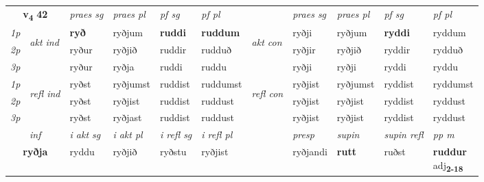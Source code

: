 \noindent
\begin{tabular}{lllllllllll} \toprule
\multicolumn{2}{c}{\textbf{v{\textsubscript{4}}} \Large{\textbf{42}}}  &  \textit{praes sg}  & \textit{praes pl}  &\textit{ pf sg} & \textit{pf pl} &  &  \textit{praes sg}  & \textit{praes pl}  & \textit{pf sg} & \textit{pf pl } \\*
	\cmidrule{3-6} \cmidrule{8-11}
 {\textit{1p}} & \multirow{3}{*}{\begin{turn}{90}\textit{akt ind}\end{turn}} & \textbf{ryð} & ryðjum & \textbf{ruddi} & \textbf{ruddum} & \multirow{3}{*}{\begin{turn}{90}\textit{akt con}\end{turn}} &ryðji & ryðjum & \textbf{ryddi} & ryddum\\*
 {\textit{2p}} &  &  ryður  & ryðjið & ruddir & rudduð & & ryðjir & ryðjið & ryddir & rydduð \\*
{\textit{3p}} &  & ryður & ryðja & ruddi & ruddu & & ryðji & ryðji& ryddi & ryddu \\*
\cmidrule{3-6} \cmidrule{8-11}
 {\textit{1p}} & \multirow{3}{*}{\begin{turn}{90}\textit{refl ind}\end{turn}}  & ryðst & ryðjumst & ruddist & ruddumst & \multirow{3}{*}{\begin{turn}{90}\textit{refl con}\end{turn}}  &ryðjist & ryðjumst & ryddist & ryddumst \\*
 {\textit{2p}} &  & ryðst & ryðjist & ruddist & ruddust & &ryðjist & ryðjist & ryddist & ryddust \\*
 {\textit{3p}}  & & ryðst & ryðjast & ruddist & ruddust & & ryðjist & ryðjist& ryddist & ryddust \\*
\cmidrule{3-6} \cmidrule{8-11}

   \multicolumn{2}{c}{\textit{inf}}  & \textit{i akt sg} & \textit{i akt pl} & \textit{i refl sg} & \textit{i refl pl} && \textit{presp} & \textit{supin} & \textit{supin refl} & \textit{pp m} \\*
  \multicolumn{2}{c}{\textbf{ryðja}} & ryddu  & ryðjið & ryðstu & ryðjist && ryðjandi &  \textbf{rutt} & ruðst & \specialcell{\textbf{ruddur} \\ adj\textbf{\textsubscript{2-18}}} \\*
\end{tabular}

